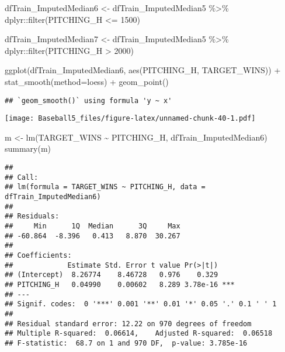 \documentclass[
]{article}
\newenvironment{Shaded}{\begin{snugshade}}{\end{snugshade}}
\newcommand{\AttributeTok}[1]{\textcolor[rgb]{0.77,0.63,0.00}{#1}}
\newcommand{\DecValTok}[1]{\textcolor[rgb]{0.00,0.00,0.81}{#1}}
\newcommand{\FunctionTok}[1]{\textcolor[rgb]{0.00,0.00,0.00}{#1}}
\newcommand{\NormalTok}[1]{#1}
\newcommand{\OtherTok}[1]{\textcolor[rgb]{0.56,0.35,0.01}{#1}}
\newcommand{\SpecialCharTok}[1]{\textcolor[rgb]{0.00,0.00,0.00}{#1}}
\begin{document}
\begin{Shaded}
\begin{Highlighting}[]
\NormalTok{dfTrain\_ImputedMedian6 }\OtherTok{\textless{}{-}}\NormalTok{ dfTrain\_ImputedMedian5 }\SpecialCharTok{\%\textgreater{}\%}
\NormalTok{  dplyr}\SpecialCharTok{::}\FunctionTok{filter}\NormalTok{(PITCHING\_H }\SpecialCharTok{\textless{}=} \DecValTok{1500}\NormalTok{)}

\NormalTok{dfTrain\_ImputedMedian7 }\OtherTok{\textless{}{-}}\NormalTok{ dfTrain\_ImputedMedian5 }\SpecialCharTok{\%\textgreater{}\%}
\NormalTok{  dplyr}\SpecialCharTok{::}\FunctionTok{filter}\NormalTok{(PITCHING\_H }\SpecialCharTok{\textgreater{}} \DecValTok{2000}\NormalTok{)}

\FunctionTok{ggplot}\NormalTok{(dfTrain\_ImputedMedian6, }\FunctionTok{aes}\NormalTok{(PITCHING\_H, TARGET\_WINS)) }\SpecialCharTok{+}
          \FunctionTok{stat\_smooth}\NormalTok{(}\AttributeTok{method=}\NormalTok{loess) }\SpecialCharTok{+}
          \FunctionTok{geom\_point}\NormalTok{()}
\end{Highlighting}
\end{Shaded}

\begin{verbatim}
## `geom_smooth()` using formula 'y ~ x'
\end{verbatim}

\texttt{[image: Baseball5\_files/figure-latex/unnamed-chunk-40-1.pdf]}

\begin{Shaded}
\begin{Highlighting}[]
\NormalTok{m }\OtherTok{\textless{}{-}} \FunctionTok{lm}\NormalTok{(TARGET\_WINS }\SpecialCharTok{\textasciitilde{}}\NormalTok{ PITCHING\_H, dfTrain\_ImputedMedian6)}
\FunctionTok{summary}\NormalTok{(m)}
\end{Highlighting}
\end{Shaded}

\begin{verbatim}
## 
## Call:
## lm(formula = TARGET_WINS ~ PITCHING_H, data = dfTrain_ImputedMedian6)
## 
## Residuals:
##     Min      1Q  Median      3Q     Max 
## -60.864  -8.396   0.413   8.870  30.267 
## 
## Coefficients:
##             Estimate Std. Error t value Pr(>|t|)    
## (Intercept)  8.26774    8.46728   0.976    0.329    
## PITCHING_H   0.04990    0.00602   8.289 3.78e-16 ***
## ---
## Signif. codes:  0 '***' 0.001 '**' 0.01 '*' 0.05 '.' 0.1 ' ' 1
## 
## Residual standard error: 12.22 on 970 degrees of freedom
## Multiple R-squared:  0.06614,    Adjusted R-squared:  0.06518 
## F-statistic:  68.7 on 1 and 970 DF,  p-value: 3.785e-16
\end{verbatim}
\end{document}
